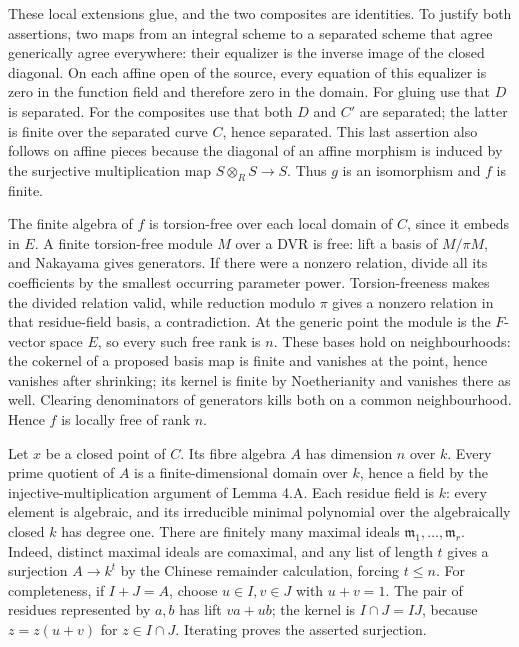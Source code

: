 \documentclass[11pt,a4paper,openany]{report}
\begin{document}
These local extensions glue, and the two composites are identities. To justify both assertions, two maps from an integral scheme to a separated scheme that agree generically agree everywhere: their equalizer is the inverse image of the closed diagonal. On each affine open of the source, every equation of this equalizer is zero in the function field and therefore zero in the domain. For gluing use that \(D\) is separated. For the composites use that both \(D\) and \(C'\) are separated; the latter is finite over the separated curve \(C\), hence separated. This last assertion also follows on affine pieces because the diagonal of an affine morphism is induced by the surjective multiplication map \(S\otimes_R S\to S\). Thus \(g\) is an isomorphism and \(f\) is finite.

The finite algebra of \(f\) is torsion-free over each local domain of \(C\), since it embeds in \(E\). A finite torsion-free module \(M\) over a DVR is free: lift a basis of \(M/\pi M\), and Nakayama gives generators. If there were a nonzero relation, divide all its coefficients by the smallest occurring parameter power. Torsion-freeness makes the divided relation valid, while reduction modulo \(\pi\) gives a nonzero relation in that residue-field basis, a contradiction. At the generic point the module is the \(F\)-vector space \(E\), so every such free rank is \(n\). These bases hold on neighbourhoods: the cokernel of a proposed basis map is finite and vanishes at the point, hence vanishes after shrinking; its kernel is finite by Noetherianity and vanishes there as well. Clearing denominators of generators kills both on a common neighbourhood. Hence \(f\) is locally free of rank \(n\).

Let \(x\) be a closed point of \(C\). Its fibre algebra \(A\) has dimension \(n\) over \(k\). Every prime quotient of \(A\) is a finite-dimensional domain over \(k\), hence a field by the injective-multiplication argument of Lemma 4.A. Each residue field is \(k\): every element is algebraic, and its irreducible minimal polynomial over the algebraically closed \(k\) has degree one. There are finitely many maximal ideals \(\mathfrak m_1,\ldots,\mathfrak m_r\). Indeed, distinct maximal ideals are comaximal, and any list of length \(t\) gives a surjection \(A\to k^t\) by the Chinese remainder calculation, forcing \(t\le n\). For completeness, if \(I+J=A\), choose \(u\in I,v\in J\) with \(u+v=1\). The pair of residues represented by \(a,b\) has lift \(va+ub\); the kernel is \(I\cap J=IJ\), because \(z=z(u+v)\) for \(z\in I\cap J\). Iterating proves the asserted surjection.
\end{document}
